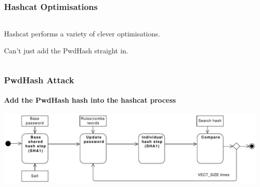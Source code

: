 \documentclass[handout, notes=hide]{beamer}
\begin{document}

\begin{frame}
\frametitle{Hashcat Optimisations}
\framesubtitle{}
\setlength{\parskip}{0.5em}

\begin{columns}[T]
\begin{column}[T]{1.0\textwidth}
\setlength{\parskip}{0.5em}

Hashcat performs a variety of clever optimisations.

Can't just add the PwdHash straight in.

\end{column}
\end{columns}


\end{frame}


\begin{frame}
\frametitle{PwdHash Attack}
\framesubtitle{Add the PwdHash hash into the hashcat process}
\setlength{\parskip}{0.5em}

\includegraphics[width=1.0\textwidth]{process-orig}

\end{frame}

\end{document}
